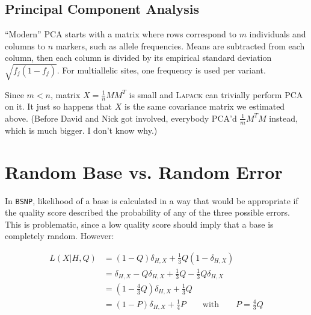 \documentclass{article}
\begin{document}


\subsection{Principal Component Analysis}


``Modern'' PCA starts with a matrix where rows correspond to $m$
individuals and columns to $n$ markers, such as allele frequencies.
Means are subtracted from each column, then each column is divided by
its empirical standard deviation $\sqrt{f_j (1 - f_j)}$.  For
multiallelic sites, one frequency is used per variant.  

Since $m < n$, matrix $X = \frac{1}{n} M M^T$ is small and
\textsc{Lapack} can trivially perform PCA on it.  It just so happens
that $X$ is the same covariance matrix we estimated above.  (Before
David and Nick got involved, everybody PCA'd $\frac{1}{m} M^T M$
instead, which is much bigger.  I don't know why.)



\appendix

\section{Random Base vs. Random Error}
\label{app_errprob}

In \texttt{BSNP}, likelihood of a base is calculated in a way that would be appropriate if the quality score described the
probability of any of the three possible errors.  This is problematic, since a low quality score should imply that a base is
completely random.  However:

\begin{align*}
L(X|H,Q) &= (1-Q)\delta_{H,X} + \frac{1}{3} Q (1-\delta_{H,X}) \\
&= \delta_{H,X} - Q\delta_{H,X} + \frac{1}{3}Q - \frac{1}{3}Q\delta_{H,X} \\
&= (1-\frac{4}{3}Q)\delta_{H,X} + \frac{1}{3}Q \\
&= (1-P) \delta_{H,X} + \frac{1}{4}P \qquad \mbox{with} \qquad P=\frac{4}{3}Q
\end{align*}
\end{document}
